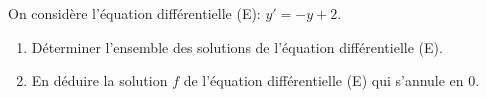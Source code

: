 \medskip

On considère l'équation différentielle (E): $y'=-y+2$.

\begin{enumerate}
\item Déterminer l'ensemble des solutions de l'équation différentielle (E).
\item En déduire la solution $f$ de l'équation différentielle (E) qui s'annule en 0.
\end{enumerate}

\bigskip

